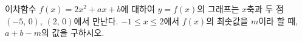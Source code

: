 이차함수 $f(x)=2x^2+ax+b$에 대하여 $y=f(x)$의 그래프는 $x$축과 두 점 $(-5,\,0)$, $(2,\,0)$에서 만난다. $-1\le x\le 2$에서 $f(x)$의 최솟값을 $m$이라 할 때, $a+b-m$의 값을 구하시오. 
